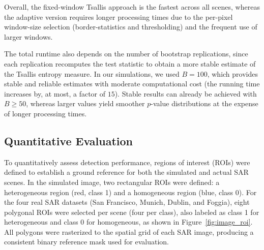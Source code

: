 \documentclass[
  lettersize  journal,
]{IEEEtran}%
\begin{document}
Overall, the fixed-window Tsallis approach is the fastest across all
scenes, whereas the adaptive version requires longer processing times
due to the per-pixel window-size selection (border-statistics and
thresholding) and the frequent use of larger windows.

The total runtime also depends on the number of bootstrap replications,
since each replication recomputes the test statistic to obtain a more
stable estimate of the Tsallis entropy measure. In our simulations, we
used \(B=100\), which provides stable and reliable estimates with
moderate computational cost (the running time increases by, at most, a
factor of \(15\)). Stable results can already be achieved with
\(B\geq50\), whereas larger values yield smoother \(p\)-value
distributions at the expense of longer processing times.

\subsection{Quantitative Evaluation}\label{quantitative-evaluation}

To quantitatively assess detection performance, regions of interest
(ROIs) were defined to establish a ground reference for both the
simulated and actual SAR scenes. In the simulated image, two rectangular
ROIs were defined: a heterogeneous region (red, class 1) and a
homogeneous region (blue, class 0). For the four real SAR datasets (San
Francisco, Munich, Dublin, and Foggia), eight polygonal ROIs were
selected per scene (four per class), also labeled as class 1 for
heterogeneous and class 0 for homogeneous, as shown in
Figure~\ref{fig:image_roi}. All polygons were rasterized to the spatial
grid of each SAR image, producing a consistent binary reference mask
used for evaluation.
\end{document}
